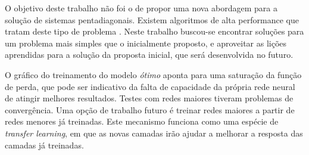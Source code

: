 \documentclass[final,5p]{elsarticle}
\numberwithin{equation}{section}
\begin{document}
    O objetivo deste trabalho não foi o de propor uma nova abordagem para a solução de sistemas pentadiagonais. Existem algoritmos de alta performance que tratam deste tipo de problema \cite{levit1989parallel,ivanov1998parallel,carroll2021batched}. Neste trabalho buscou-se encontrar soluções para um problema mais simples que o inicialmente proposto, e aproveitar as lições aprendidas para a solução da proposta inicial, que será desenvolvida no futuro.

    O gráfico do treinamento do modelo \emph{ótimo} aponta para uma saturação da função de perda, que pode ser indicativo da falta de capacidade da própria rede neural de atingir melhores resultados. Testes com redes maiores tiveram problemas de convergência. Uma opção de trabalho futuro é treinar redes maiores a partir de redes menores já treinadas. Este mecanismo funciona como uma espécie de \emph{transfer learning}, em que as novas camadas irão ajudar a melhorar a resposta das camadas já treinadas.















\end{document}
